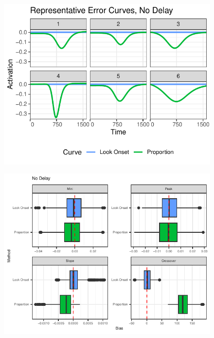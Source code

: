 \documentclass{beamer}
\begin{document}
\begin{frame}
\begin{figure}[H]
\centering
\includegraphics{error_no_delay.pdf}
\end{figure}
\end{frame}


\begin{frame}
\begin{figure}[H]
\centering
\includegraphics{no_delay_bar_plot.pdf}
\end{figure}
\end{frame}
\end{document}
